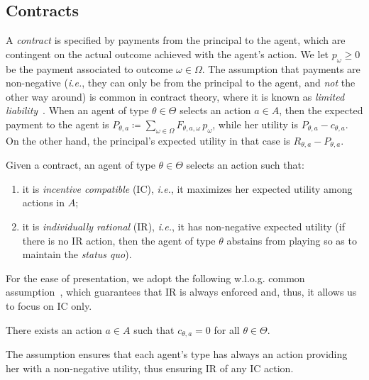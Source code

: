 \subsection{Contracts}\label{sec:preliminaries_contracts}


A \emph{contract} is specified by payments from the principal to the agent, which are contingent on the actual outcome achieved with the agent's action.
%
We let $p_\omega \ge 0$ be the payment associated to outcome $\omega \in\Omega$.
%
The assumption that payments are non-negative (\emph{i.e.}, they can only be from the principal to the agent, and \emph{not} the other way around) is common in contract theory, where it is known as \emph{limited liability}~\citep{carroll2015robustness}.
%
When an agent of type $\theta \in \Theta$ selects an action $a \in A$, then the expected payment to the agent is $P_{\theta,a} \coloneqq \sum_{\omega \in \Omega} F_{\theta, a, \omega} \, p_\omega$, while her utility is $P_{\theta,a} - c_{\theta, a}$.
%
On the other hand, the principal's expected utility in that case is $R_{\theta,a} -P_{\theta,a}$.


Given a contract, an agent of type $\theta \in \Theta$ selects an action such that:
%
\begin{enumerate}
	\item it is \emph{incentive compatible} (IC), \emph{i.e.}, it maximizes her expected utility among actions in $A$;
	\item it is \emph{individually rational} (IR), \emph{i.e.}, it has non-negative expected utility (if there is no IR action, then the agent of type $\theta$ abstains from playing so as to maintain the \emph{status quo}).
\end{enumerate}


For the ease of presentation, we adopt the following w.l.o.g. common assumption~\citep{dutting2019simple}, which guarantees that IR is always enforced and, thus, it allows us to focus on IC only.
%
\begin{assumption}\label{ass:ir}
	There exists an action $a \in A$ such that $c_{\theta, a} = 0$ for all $\theta \in \Theta$.
\end{assumption} 
%
The assumption ensures that each agent's type has always an action providing her with a non-negative utility, thus ensuring IR of any IC action.


